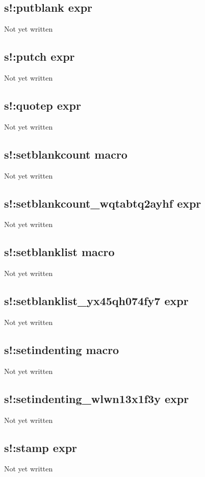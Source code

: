 \documentclass[a4paper,11pt]{article}
\begin{document}
\subsection{\ttfamily s!:putblank expr}
Not yet written

\subsection{\ttfamily s!:putch expr}
Not yet written

\subsection{\ttfamily s!:quotep expr}
Not yet written

\subsection{\ttfamily s!:setblankcount macro}
Not yet written

\subsection{\ttfamily s!:setblankcount\_wqtabtq2ayhf expr}
Not yet written

\subsection{\ttfamily s!:setblanklist macro}
Not yet written

\subsection{\ttfamily s!:setblanklist\_yx45qh074fy7 expr}
Not yet written

\subsection{\ttfamily s!:setindenting macro}
Not yet written

\subsection{\ttfamily s!:setindenting\_wlwn13x1f3y expr}
Not yet written

\subsection{\ttfamily s!:stamp expr}
Not yet written
\end{document}

